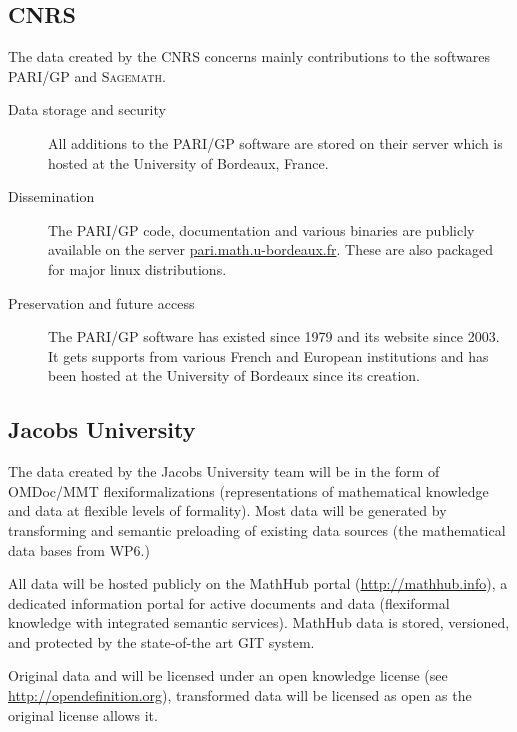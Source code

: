 \documentclass[12pt]{article}
\newcommand{\software}[1]{\textsc{#1}\xspace}
\newcommand{\Sage}{\software{Sagemath}}
\newcommand{\PARIGP}{\software{PARI/GP}}
\begin{document}
\subsection{CNRS}

The data created by the CNRS concerns mainly contributions to the softwares \PARIGP and \Sage.
\begin{description}
\item[Data storage and security] All additions to the \PARIGP software are stored on their server which is hosted at the University of Bordeaux, France.
\item[Dissemination] The \PARIGP code, documentation and various binaries are publicly available on the server \href{http://pari.math.u-bordeaux.fr/}{pari.math.u-bordeaux.fr}. These are also packaged for major linux distributions.
\item[Preservation and future access] The \PARIGP software has existed
  since 1979 and its website since 2003. It gets supports from various
  French and European institutions and has been hosted at the University of Bordeaux since its creation.
\end{description}


\subsection{Jacobs University}

The data created by the Jacobs University team will be in the form of OMDoc/MMT
flexiformalizations (representations of mathematical knowledge and data at flexible levels
of formality). Most data will be generated by transforming and semantic preloading of
existing data sources (the mathematical data bases from WP6.)

All data will be hosted publicly on the MathHub portal (\url{http://mathhub.info}), a
dedicated information portal for active documents and data (flexiformal knowledge with
integrated semantic services). MathHub data is stored, versioned, and protected by the
state-of-the art GIT system.

Original data and will be licensed under an open knowledge license (see
\url{http://opendefinition.org}), transformed data will be licensed as open as the
original license allows it.
\end{document}
